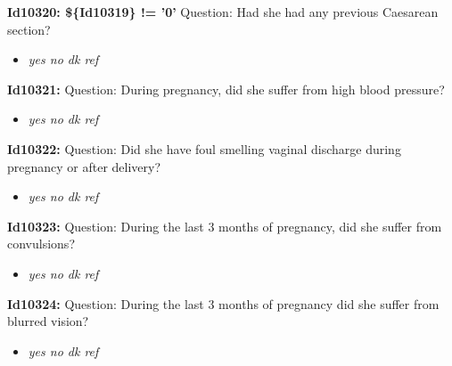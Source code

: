 \documentclass{article}%
\begin{document}
\textbf{Id10320: \$\{Id10319\} != '0'\newline%
}%
Question: Had she had any previous Caesarean section?\newline%
%
\begin{itemize}%
\item%
\textit{yes\newline%
 no\newline%
 dk\newline%
 ref\newline%
}%
\end{itemize}%
\textbf{Id10321: \newline%
}%
Question: During pregnancy, did she suffer from high blood pressure?\newline%
%
\begin{itemize}%
\item%
\textit{yes\newline%
 no\newline%
 dk\newline%
 ref\newline%
}%
\end{itemize}%
\textbf{Id10322: \newline%
}%
Question: Did she have foul smelling vaginal discharge during pregnancy or after delivery?\newline%
%
\begin{itemize}%
\item%
\textit{yes\newline%
 no\newline%
 dk\newline%
 ref\newline%
}%
\end{itemize}%
\textbf{Id10323: \newline%
}%
Question: During the last 3 months of pregnancy, did she suffer from convulsions?\newline%
%
\begin{itemize}%
\item%
\textit{yes\newline%
 no\newline%
 dk\newline%
 ref\newline%
}%
\end{itemize}%
\textbf{Id10324: \newline%
}%
Question: During the last 3 months of pregnancy did she suffer from blurred vision?\newline%
%
\begin{itemize}%
\item%
\textit{yes\newline%
 no\newline%
 dk\newline%
 ref\newline%
}%
\end{itemize}%
\end{document}
